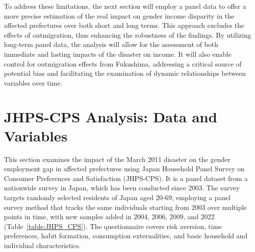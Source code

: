 \documentclass[a4paper,12pt]{article}
\begin{document}
To address these limitations, the next section will employ a panel data to offer a more precise estimation of the real impact on gender income disparity in the affected prefectures over both short and long terms. This approach excludes the effects of outmigration, thus enhancing the robustness of the findings. By utilizing long-term panel data, the analysis will allow for the assessment of both immediate and lasting impacts of the disaster on income. It will also enable control for outmigration effects from Fukushima, addressing a critical source of potential bias and facilitating the examination of dynamic relationships between variables over time.






\section{JHPS-CPS Analysis: Data and Variables}

This section examines the impact of the March 2011 disaster on the gender employment gap in affected prefectures using Japan Household Panel Survey on Consumer Preferences and Satisfaction (JHPS-CPS). It is a panel dataset from a nationwide survey in Japan, which has been conducted since 2003. The survey targets randomly selected residents of Japan aged 20-69, employing a panel survey method that tracks the same individuals starting from 2003 over multiple points in time, with new samples added in 2004, 2006, 2009, and 2022 (Table~\ref{table:JHPS_CPS}). The questionnaire covers risk aversion, time preferences, habit formation, consumption externalities, and basic household and individual characteristics. 




\end{document}
